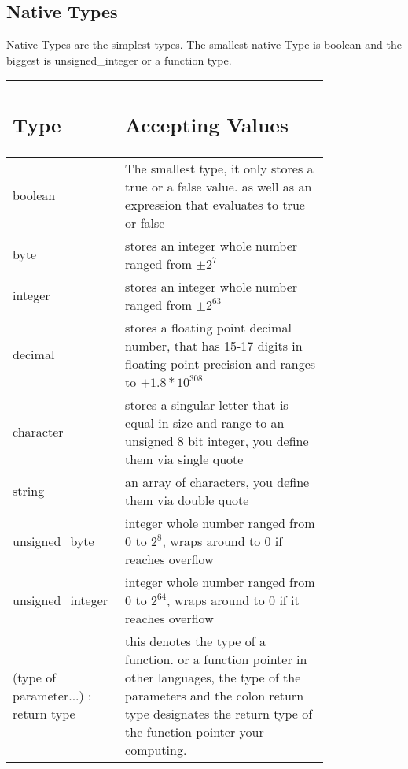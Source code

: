 \documentclass{article}
\begin{document}
\subsection{Native Types}

Native Types are the simplest types. The smallest native Type is boolean and the biggest is unsigned\_integer or a function type. 

\begin{table}[H]
    \centering
    \begin{tabular}{p{0.2\linewidth} | p{0.6\linewidth}}

\subsection*{Type} & \subsection*{Accepting Values}
 \\ \hline
      boolean & The smallest type, it only stores a true or a false value. as well as an expression that evaluates to true or false\\ \hline
      byte & stores an integer whole number ranged from $\pm 2^{7}$ \\ \hline
      integer & stores an integer whole number ranged from $\pm2^{63}$ \\ \hline
      decimal & stores a floating point decimal number, that has 15-17 digits in floating point precision and ranges to $\pm1.8*10^{308}$ \\ \hline
      character & stores a singular letter that is equal in size and range to an unsigned 8 bit integer, you define them via single quote \\ \hline
      string &  an array of characters, you define them via double quote\\ \hline
      unsigned\_byte &  integer whole number ranged from $0$ to $2^{8}$, wraps around to 0 if reaches overflow \\ \hline
      unsigned\_integer & integer whole number ranged from $0$ to $2^{64}$, wraps around to 0 if it reaches overflow \\ \hline
      (type of parameter...) : return type & this denotes the type of a function. or a function pointer in other languages, the type of the parameters and the colon return type designates the return type of the function pointer your computing. \\ \hline
    \end{tabular}
\end{table}
\end{document}

